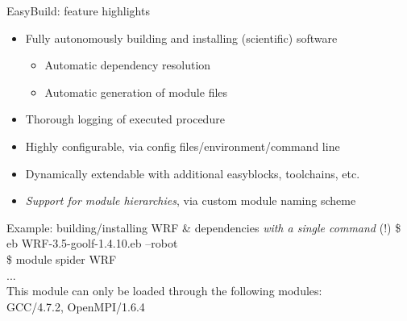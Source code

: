\documentclass[10pt,xcolor={usenames,dvipsnames}]{beamer}
\begin{document}
\begin{frame}{EasyBuild: feature highlights}
\begin{itemize}
    \item
        Fully autonomously building and installing (scientific) software
        \begin{itemize}
            \item
                Automatic dependency resolution
            \item
                Automatic generation of module files
        \end{itemize}
    \item
        Thorough logging of executed procedure
    \item
        Highly configurable, via config files/environment/command line
    \item
        Dynamically extendable with additional easyblocks, toolchains, etc.
    \item
        \emph{Support for module hierarchies}, via custom module naming scheme
\end{itemize}
\quad\quad
\begin{minipage}{0.9\textwidth}
    \begin{exampleblock}{\footnotesize Example: building/installing WRF \& dependencies \emph{with a single command} (!)}
        \scriptsize
        \ttfamily
        \$ eb WRF-3.5-goolf-1.4.10.eb --robot\\
        \$ module spider WRF\\
        ...\\
        This module can only be loaded through the following modules:\\
        GCC/4.7.2, OpenMPI/1.6.4
    \end{exampleblock}
\end{minipage}
\end{frame}

\end{document}
